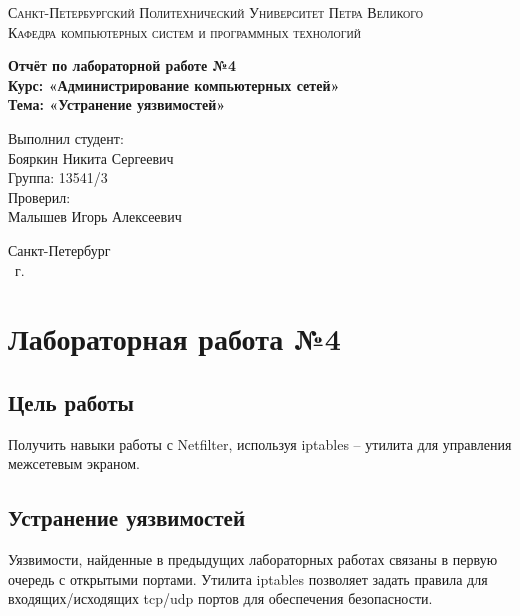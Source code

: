 \documentclass[14pt,a4paper,report]{report}
\begin{document}
\def\contentsname{Содержание}

\begin{titlepage}
	\begin{center}
		\textsc{Санкт-Петербургский Политехнический 
			Университет Петра Великого\\[5mm]
			Кафедра компьютерных систем и программных технологий}
		
		\vfill
		
		\textbf{Отчёт по лабораторной работе №4\\[3mm]
			Курс: «Администрирование компьютерных сетей»\\[3mm]
			Тема: «Устранение уязвимостей»\\[35mm]
			}
	\end{center}
	
	\hfill
	\begin{minipage}{.5\textwidth}
		Выполнил студент:\\[2mm] 
		Бояркин Никита Сергеевич\\
		Группа: 13541/3\\[5mm]
		
		Проверил:\\[2mm] 
		Малышев Игорь Алексеевич
	\end{minipage}
	\vfill
	\begin{center}
		Санкт-Петербург\\ \the\year\ г.
	\end{center}
\end{titlepage}

\tableofcontents
\clearpage

\chapter{Лабораторная работа №4}

\section{Цель работы}

Получить навыки работы с Netfilter, используя iptables -- утилита для управления межсетевым экраном.

\section{Устранение уязвимостей}

Уязвимости, найденные в предыдущих лабораторных работах связаны в первую очередь с открытыми портами. Утилита iptables позволяет задать правила для входящих/исходящих tcp/udp портов для обеспечения безопасности.
\end{document}
